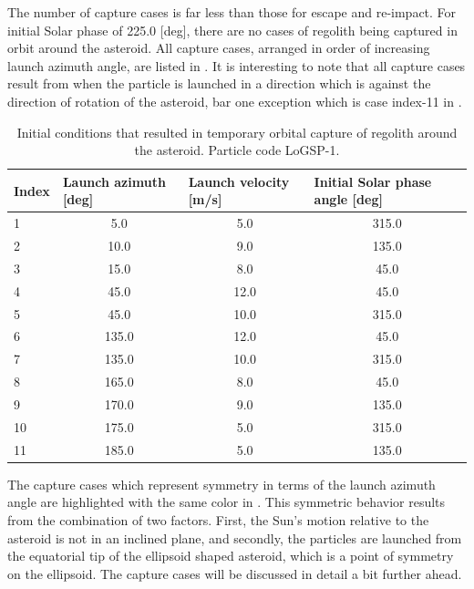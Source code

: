 The number of capture cases is far less than those for escape and re-impact. For initial Solar phase of 225.0 [deg], there are no cases of regolith being captured in orbit around the asteroid. All capture cases, arranged in order of increasing launch azimuth angle, are listed in . It is interesting to note that all capture cases result from when the particle is launched in a direction which is against the direction of rotation of the asteroid, bar one exception which is case index-11 in .
\begin{table}[htb]
\centering
\captionsetup{justification=centering}
\caption{Initial conditions that resulted in temporary orbital capture of regolith around the asteroid. Particle code LoGSP-1.}
\label{tab:LoGSP_1_capture}
\begin{tabular}{|l|c|c|c|}
\hline
Index & \multicolumn{1}{l|}{Launch azimuth [deg]} & \multicolumn{1}{l|}{Launch velocity [m/s]} & \multicolumn{1}{l|}{Initial Solar phase angle [deg]} \\ \hline
\rowcolor[HTML]{FE996B}
1   & 5.0 & 5.0 & 315.0     \\ \hline
\rowcolor[HTML]{67FD9A}
2   & 10.0 & 9.0 & 135.0    \\ \hline
\rowcolor[HTML]{9698ED}
3   & 15.0 & 8.0 & 45.0     \\ \hline
\rowcolor[HTML]{FFCC67}
4   & 45.0 & 12.0 & 45.0    \\ \hline
\rowcolor[HTML]{96FFFB}
5   & 45.0 & 10.0 & 315.0   \\ \hline
\rowcolor[HTML]{FFCC67}
6   & 135.0 & 12.0 & 45.0   \\ \hline
\rowcolor[HTML]{96FFFB}
7   & 135.0 & 10.0 & 315.0  \\ \hline
\rowcolor[HTML]{9698ED}
8   & 165.0 & 8.0 & 45.0    \\ \hline
\rowcolor[HTML]{67FD9A}
9   & 170.0 & 9.0 & 135.0   \\ \hline
\rowcolor[HTML]{FE996B}
10  & 175.0 & 5.0 & 315.0   \\ \hline
11  & 185.0 & 5.0 & 135.0   \\ \hline
\end{tabular}
\end{table}
The capture cases which represent symmetry in terms of the launch azimuth angle are highlighted with the same color in . This symmetric behavior results from the combination of two factors. First, the Sun's motion relative to the asteroid is not in an inclined plane, and secondly, the particles are launched from the equatorial tip of the ellipsoid shaped asteroid, which is a point of symmetry on the ellipsoid. The capture cases will be discussed in detail a bit further ahead.
